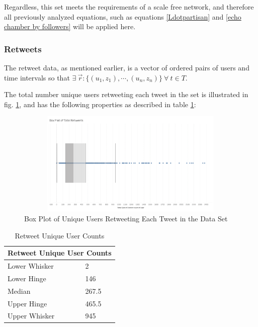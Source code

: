 \documentclass[preprint,review,12pt]{elsarticle}
\begin{document}
Regardless, this set meets the requirements of a scale free network, and therefore all previously analyzed equations, such as equations \ref{Ldotpartisan} and \ref{echo chamber by followers} will be applied here.

\subsubsection{Retweets}
The retweet data, as mentioned earlier, is a vector of ordered pairs of users and time intervals so that $ \exists \ \vec{r}:\{(u_1,z_1), \cdots, (u_n,z_n)\} \ \forall \ t \in T$.

The total number unique users retweeting each tweet in the set is illustrated in fig. \ref{fig:Unique Retweeters}, and has the following properties as described in table \ref{Retweet Unique User Counts}:
\begin{figure}[h]
 \centering
  \includegraphics[width=12cm,height=5cm]{Retweet Box Plot.png}
  \caption{Box Plot of Unique Users Retweeting Each Tweet in the Data Set}\label{fig:Unique Retweeters}
 \end{figure}
 
\begin{table}[h]
\centering
\begin{tabular}{ |p{3cm}|p{3cm}|  }
\hline
\multicolumn{2}{|c|}{Retweet Unique User Counts} \\
\hline
Lower Whisker & 2\\
Lower Hinge & 146 \\
Median & 267.5 \\
Upper Hinge & 465.5 \\
Upper Whisker & 945 \\
\hline
\end{tabular}
\caption{Retweet Unique User Counts}
\label{Retweet Unique User Counts}
\end{table}
\end{document}
